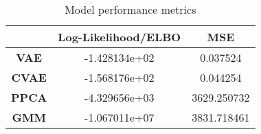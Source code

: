 \begin{table}[!h]
\centering
\caption{Model performance metrics}
\label{table:metrics}
\begin{tabular}{ccc}
\toprule
{} &  \textbf{Log-Likelihood/ELBO} &  \textbf{MSE} \\
\midrule
\textbf{VAE } &                 -1.428134e+02 &      0.037524 \\
\textbf{CVAE} &                 -1.568176e+02 &      0.044254 \\
\textbf{PPCA} &                 -4.329656e+03 &   3629.250732 \\
\textbf{GMM } &                 -1.067011e+07 &   3831.718461 \\
\bottomrule
\end{tabular}
\end{table}
